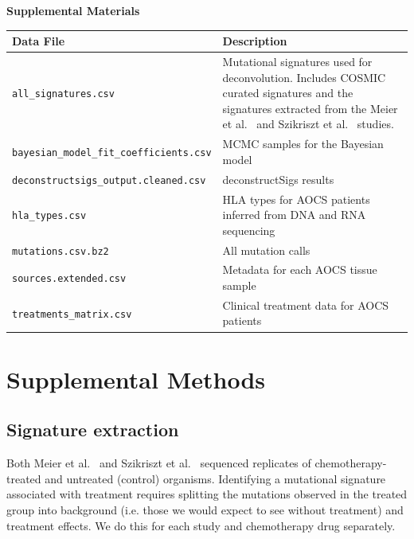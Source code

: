 
\pagebreak
\begin{center}
\textbf{\large Supplemental Materials}
\end{center}

\setcounter{equation}{0}
\setcounter{figure}{0}
\setcounter{table}{0}
\makeatletter
\renewcommand{\theequation}{S\arabic{equation}}
\renewcommand{\thefigure}{S\arabic{figure}}

\begin{center}
    \begin{tabular}{ | l | p{8cm} |}
    \hline
    Data File & Description \\ \hline
    \texttt{all\_signatures.csv} & Mutational signatures used for deconvolution. Includes COSMIC curated signatures and the signatures extracted from the Meier et al.~\cite{Meier_2014} and Szikriszt et al.~\cite{Szikriszt_2016} studies. \\ \hline
    \texttt{bayesian\_model\_fit\_coefficients.csv} & MCMC samples for the Bayesian model \\ \hline
    \texttt{deconstructsigs\_output.cleaned.csv} & deconstructSigs results \\ \hline
    \texttt{hla\_types.csv} & HLA types for AOCS patients inferred from DNA and RNA sequencing \\ \hline
    \texttt{mutations.csv.bz2} & All mutation calls \\ \hline
    \texttt{sources.extended.csv} & Metadata for each AOCS tissue sample \\ \hline
    \texttt{treatments\_matrix.csv} & Clinical treatment data for AOCS patients \\ \hline
    \end{tabular}
\end{center}

\section*{Supplemental Methods}

\subsection*{Signature extraction}
Both Meier et al.~\cite{Meier_2014} and Szikriszt et al.~\cite{Szikriszt_2016} sequenced replicates of chemotherapy-treated and untreated (control) organisms. Identifying a mutational signature associated with treatment requires splitting the mutations observed in the treated group into background (i.e. those we would expect to see without treatment) and treatment effects. We do this for each study and chemotherapy drug separately.

